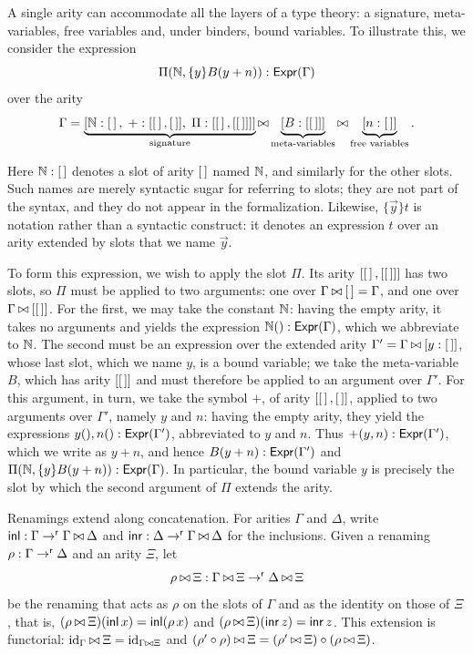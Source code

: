 \begin{example}\label{ex:layers}
    A single arity can accommodate all the layers of a type theory: a signature, meta-variables, free variables and, under binders, bound variables. To illustrate this, we consider the expression
    \[
    \Pi(\mathbb{N}, \{y\}B(y + n)) : \mathsf{Expr}(\Gamma)
    \]
    over the arity
    \[
    \Gamma = \underbrace{[\mathbb{N} : \left[\,\right],\; {+} : [\left[\,\right], \left[\,\right]],\; \Pi : [\left[\,\right], [\left[\,\right]]]]}_{\text{signature}} \mathbin{\bowtie} \underbrace{[B : [\left[\,\right]]]}_{\text{meta-variables}} \mathbin{\bowtie} \underbrace{[n : \left[\,\right]]}_{\text{free variables}}.
    \]

    Here $\mathbb{N} : \left[\,\right]$ denotes a slot of arity $\left[\,\right]$ named $\mathbb{N}$, and similarly for the other slots. Such names are merely syntactic sugar for referring to slots; they are not part of the syntax, and they do not appear in the formalization. Likewise, $\{\vec y\}t$ is notation rather than a syntactic construct: it denotes an expression $t$ over an arity extended by slots that we name $\vec y$.

    To form this expression, we wish to apply the slot $\Pi$. Its arity $[\left[\,\right], [\left[\,\right]]]$ has two slots, so $\Pi$ must be applied to two arguments: one over $\Gamma \mathbin{\bowtie} \left[\,\right] = \Gamma$, and one over $\Gamma \mathbin{\bowtie} [\left[\,\right]]$. For the first, we may take the constant $\mathbb{N}$: having the empty arity, it takes no arguments and yields the expression $\mathbb{N}() : \mathsf{Expr}(\Gamma)$, which we abbreviate to $\mathbb{N}$. The second must be an expression over the extended arity $\Gamma' = \Gamma \mathbin{\bowtie} [y : \left[\,\right]]$, whose last slot, which we name $y$, is a bound variable; we take the meta-variable $B$, which has arity $[\left[\,\right]]$ and must therefore be applied to an argument over $\Gamma'$. For this argument, in turn, we take the symbol ${+}$, of arity $[\left[\,\right], \left[\,\right]]$, applied to two arguments over $\Gamma'$, namely $y$ and $n$: having the empty arity, they yield the expressions $y(), n() : \mathsf{Expr}(\Gamma')$, abbreviated to $y$ and $n$. Thus ${+}(y, n) : \mathsf{Expr}(\Gamma')$, which we write as $y + n$, and hence $B(y + n) : \mathsf{Expr}(\Gamma')$ and $\Pi(\mathbb{N}, \{y\}B(y + n)) : \mathsf{Expr}(\Gamma)$. In particular, the bound variable $y$ is precisely the slot by which the second argument of $\Pi$ extends the arity.
\end{example}

Renamings extend along concatenation. For arities $\Gamma$ and $\Delta$, write $\mathsf{inl} : \Gamma \to^{\mathsf{r}} \Gamma \mathbin{\bowtie} \Delta$ and $\mathsf{inr} : \Delta \to^{\mathsf{r}} \Gamma \mathbin{\bowtie} \Delta$ for the inclusions. Given a renaming $\rho : \Gamma \to^{\mathsf{r}} \Delta$ and an arity $\Xi$, let
\[
\rho \mathbin{\bowtie} \Xi : \Gamma \mathbin{\bowtie} \Xi \to^{\mathsf{r}} \Delta \mathbin{\bowtie} \Xi
\]
be the renaming that acts as $\rho$ on the slots of $\Gamma$ and as the identity on those of $\Xi$, that is, $(\rho \mathbin{\bowtie} \Xi)(\mathsf{inl}\, x) = \mathsf{inl}(\rho\, x)$ and $(\rho \mathbin{\bowtie} \Xi)(\mathsf{inr}\, z) = \mathsf{inr}\, z$. This extension is functorial: $\mathrm{id}_\Gamma \mathbin{\bowtie} \Xi = \mathrm{id}_{\Gamma \mathbin{\bowtie} \Xi}$ and $(\rho' \circ \rho) \mathbin{\bowtie} \Xi = (\rho' \mathbin{\bowtie} \Xi) \circ (\rho \mathbin{\bowtie} \Xi)$.

